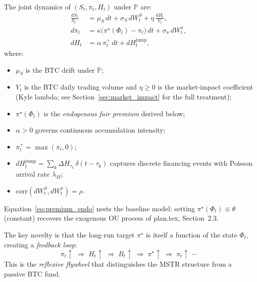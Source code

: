 \begin{definition}
  \label{def:coupled_sdes}
  The joint dynamics of $(S_t, \pi_t, H_t)$ under $\mathbb{P}$ are:
  \begin{align}
    \frac{dS_t}{S_{t^-}} &= \mu_S\,dt + \sigma_S\,dW_t^S
      + \eta\,\frac{dH_t}{V_t},
    \label{eq:btc_impact} \\[6pt]
    d\pi_t &= \kappa\bigl(\pi^\star(\Phi_t) - \pi_t\bigr)\,dt
      + \sigma_\pi\,dW_t^\pi,
    \label{eq:premium_endo} \\[6pt]
    dH_t &= \alpha\,\pi_t^+\,dt + dH_t^{\mathrm{jump}},
    \label{eq:holdings_endo}
  \end{align}
  where:
  \begin{itemize}
    \item $\mu_S$ is the BTC drift under $\mathbb{P}$;
    \item $V_t$ is the BTC daily trading volume and $\eta \ge 0$ is the
          market-impact coefficient (Kyle lambda; see
          Section~\ref{sec:market_impact} for the full treatment);
    \item $\pi^\star(\Phi_t)$ is the \emph{endogenous fair premium} derived
          below;
    \item $\alpha > 0$ governs continuous accumulation intensity;
    \item $\pi_t^+ = \max(\pi_t,0)$;
    \item $dH_t^{\mathrm{jump}} = \sum_k \Delta H_{\tau_k}\,\delta(t - \tau_k)$
          captures discrete financing events with Poisson arrival rate
          $\lambda_M$;
    \item $\mathrm{corr}(dW_t^S, dW_t^\pi) = \rho$.
  \end{itemize}
\end{definition}

\begin{remark}
  Equation~\eqref{eq:premium_endo} nests the baseline model: setting
  $\pi^\star(\Phi_t) \equiv \theta$ (constant) recovers the exogenous OU
  process of plan.tex, Section~2.3.
\end{remark}

The key novelty is that the long-run target $\pi^\star$ is itself a function
of the state $\Phi_t$, creating a \emph{feedback loop}:
\begin{equation}
  \label{eq:feedback_loop}
  \pi_t \uparrow \;\Longrightarrow\;
  H_t \uparrow \;\Longrightarrow\;
  B_t \uparrow \;\Longrightarrow\;
  \pi^\star \uparrow \;\Longrightarrow\;
  \pi_t \uparrow \;\cdots
\end{equation}
This is the \emph{reflexive flywheel} that distinguishes the MSTR structure
from a passive BTC fund.

